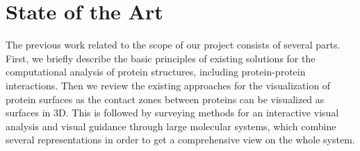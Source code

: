 \documentclass[11pt,a4paper,titlepage,oneside,onecolumn]{article}
\begin{document}








\section{State of the Art}
\label{sec:StateOfTheArt}
The previous work related to the scope of our project consists of several parts. 
First, we briefly describe the basic principles of existing solutions for the computational analysis of protein structures, including protein-protein interactions. 
Then we review the existing approaches for the visualization of protein surfaces as the contact zones between proteins can be visualized as surfaces in 3D.
This is followed by surveying methods for an interactive visual analysis and visual guidance through large molecular systems, which combine several representations in order to get a comprehensive view on the whole system. 
\end{document}
